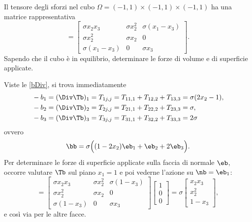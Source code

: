 \begin{exercise}
	Il tensore degli sforzi nel cubo $\Omega=(-1,1)\times(-1,1)\times(-1,1)$ ha una matrice rappresentativa
	\begin{equation}
		[\Tb]=\left[\begin{array}{ccc}
			\sigma x_2 x_3	& \sigma x_2^2 & \sigma(x_1-x_3)  \\
			\sigma x_2^2	& \sigma x_2 & 0 \\
			\sigma(x_1-x_3)  	&  0 &  \sigma x_3
		\end{array}\right].
	\end{equation}
	Sapendo che il cubo è in equilibrio, determinare le forze di volume e di superficie applicate.
	\begin{svolgimento}
		Viste le \eqref{bDiv}, si trova immediatamente
		\begin{equation}
			\begin{aligned}
				&	-b_1=(\Div \Tb)_1=T_{1j,j}=T_{11,1}+T_{12,2}+T_{13,3}=\sigma(2x_2-1),\\
				&-b_2=(\Div \Tb)_2=T_{2j,j}=T_{21,1}+T_{22,2}+T_{23,3}=\sigma,\\
				&-b_3=(\Div \Tb)_3=T_{3j,j}=T_{31,1}+T_{32,2}+T_{33,3}=2\sigma
			\end{aligned}
		\end{equation}
		ovvero
		\begin{equation}
			\bb = \sigma\Big(  (1-2x_2)\eb_1+\eb_2+2\eb_3 \Big).
		\end{equation}
		Per determinare le forze di superficie applicate sulla faccia di normale $\eb$, occorre valutare $\Tb$ sul piano $x_1=1$ e poi vederne l'azione su $\nb =\eb_1$:
		\begin{equation}
			[\Tb(1,x_2,x_3)]=\left[\begin{array}{ccc}
				\sigma x_2 x_3	& \sigma x_2^2 & \sigma(1-x_3)  \\
				\sigma x_2^2	& \sigma x_2 & 0 \\
				\sigma(1-x_3)  	&  0 &  \sigma x_3
			\end{array}\right]
			\left[\begin{array}{c}
				1\\
				0\\
				0
			\end{array}\right]	=\sigma
			\left[\begin{array}{c}
				x_2x_3\\
				x_2^2\\
				1-x_3
			\end{array}\right],
		\end{equation}
		e così via per le altre facce.
	\end{svolgimento}
\end{exercise}




